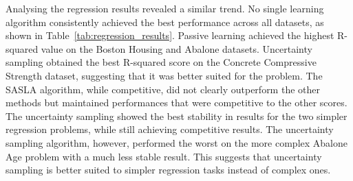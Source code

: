 \documentclass[conference]{IEEEtran}
\begin{document}
	\begin{table}[htbp]
		\centering
		\caption{Classification results for each learning strategy}
		\label{tab:classification_results}
	\end{table}
	
	Analysing the regression results revealed a similar trend. No single learning algorithm consistently achieved the best performance across all datasets, as shown in Table~\ref{tab:regression_results}. Passive learning achieved the highest R-squared value on the Boston Housing and Abalone datasets. Uncertainty sampling obtained the best R-squared score on the Concrete Compressive Strength dataset, suggesting that it was better suited for the problem. The SASLA algorithm, while competitive, did not clearly outperform the other methods but maintained performances that were competitive to the other scores. The uncertainty sampling showed the best stability in results for the two simpler regression problems, while still achieving competitive results. The uncertainty sampling algorithm, however, performed the worst on the more complex Abalone Age problem with a much less stable result. This suggests that uncertainty sampling is better suited to simpler regression tasks instead of complex ones. 
	
\end{document}
